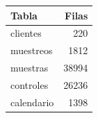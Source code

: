\begin{tabular}{lr}
\toprule
Tabla & Filas \\
\midrule
clientes & 220 \\
muestreos & 1812 \\
muestras & 38994 \\
controles & 26236 \\
calendario & 1398 \\
\bottomrule
\end{tabular}
